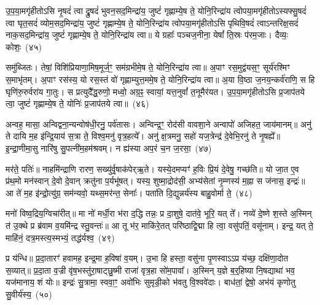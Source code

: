 {\anuvakamend[{अ॒ज॒य॒त् षट्च॑त्वारिꣳशच्च}]}%

उ॒प॒या॒मगृ॑हीतो\-ऽसि नृ॒षदं॑ त्वा द्रु॒षदं॑ भुवन॒सद॒मिन्द्रा॑य॒ जुष्टं॑ गृह्णाम्ये॒ष ते॒ योनि॒रिन्द्रा॑य त्वोपया॒मगृ॑हीतो\-ऽस्यफ्सु॒षदं॑ त्वा घृत॒सदं॑ व्योम॒सद॒मिन्द्रा॑य॒ जुष्टं॑ गृह्णाम्ये॒ष ते॒ योनि॒रिन्द्रा॑य त्वोपया॒मगृ॑हीतो\-ऽसि पृथिवि॒षदं॑ त्वा\-ऽन्तरिक्ष॒सदं॑ नाक॒सद॒मिन्द्रा॑य॒ जुष्टं॑ गृह्णाम्ये॒ष ते॒ योनि॒रिन्द्रा॑य त्वा॥ ये ग्रहाः᳚ पञ्चज॒नीना॒ येषां᳚ ति॒स्रः प॑रम॒जाः। दैव्यः॒ कोशः॒~(४५)

समु॑ब्जितः। तेषां॒ विशि॑प्रियाणा॒मिष॒मूर्ज॒ꣳ॒ सम॑ग्रभीमे॒ष ते॒ योनि॒रिन्द्रा॑य त्वा॥ अ॒पाꣳ रस॒मुद्व॑यस॒ꣳ॒ सूर्य॑रश्मिꣳ स॒माभृ॑तम्। अ॒पाꣳ रस॑स्य॒ यो रस॒स्तं वो॑ गृह्णाम्युत्त॒ममे॒ष ते॒ योनि॒रिन्द्रा॑य त्वा॥ अ॒या वि॒ष्ठा ज॒नय॒न्कर्व॑राणि॒ स हि घृणि॑रु॒रुर्वरा॑य गा॒तुः। स प्रत्युदै᳚द्ध॒रुणो॒ मध्वो॒ अग्र॒ꣴ॒ स्वायां॒ यत्त॒नुवां᳚ त॒नूमैर॑यत। उ॒प॒या॒मगृ॑हीतो\-ऽसि प्र॒जा\-प॑तये त्वा॒ जुष्टं॑ गृह्णाम्ये॒ष ते॒ योनिः॑ प्र॒जा\-प॑तये त्वा॥~(४६)

{\anuvakamend[{कोश॑स्त॒नुवां॒ त्रयो॑दश च}]}%

अन्वह॒ मासा॒ अन्विद्वना॒न्यन्वोष॑धी॒रनु॒ पर्व॑तासः। अन्विन्द्र॒ꣳ॒ रोद॑सी वावशा॒ने अन्वापो॑ अजिहत॒ जाय॑मानम्॥ अनु॑ ते दायि म॒ह इ॑न्द्रि॒याय॑ स॒त्रा ते॒ विश्व॒मनु॑ वृत्र॒हत्ये᳚। अनु॑ क्ष॒त्रमनु॒ सहो॑ यज॒त्रेन्द्र॑ दे॒वेभि॒रनु॑ ते नृ॒षह्ये᳚॥ इ॒न्द्रा॒णीमा॒सु नारि॑षु सु॒पत्नी॑म॒हम॑श्रवम्। न ह्य॑स्या अप॒रं च॒न ज॒रसा॒~(४७)

मर॑ते॒ पतिः॑॥ नाहमि॑न्द्राणि रारण॒ सख्यु॑र्वृ॒षाक॑पेर्‌ऋ॒ते। यस्ये॒दमप्यꣳ॑ ह॒विः प्रि॒यं दे॒वेषु॒ गच्छ॑ति॥ यो जा॒त ए॒व प्र॑थ॒मो मन॑स्वान् दे॒वो दे॒वान् क्रतु॑ना प॒र्यभू॑षत्। यस्य॒ शुष्मा॒द्रोद॑सी॒ अभ्य॑सेतां नृ॒म्णस्य॑ म॒ह्ना स ज॑नास॒ इन्द्रः॑॥ आ ते॑ म॒ह इ॑न्द्रो॒त्यु॑ग्र॒ सम॑न्यवो॒ यथ्स॒मर॑न्त॒ सेनाः᳚। पता॑ति दि॒द्युन्नर्य॑स्य बाहु॒वोर्मा ते॒~(४८)

मनो॑ विष्व॒द्रिय॒ग्विचा॑रीत्॥ मा नो॑ मर्धी॒रा भ॑रा द॒द्धि तन्नः॒ प्र दा॒शुषे॒ दात॑वे॒ भूरि॒ यत् ते᳚। नव्ये॑ दे॒ष्णे श॒स्ते अ॒स्मिन् त॑ उ॒क्थे प्र ब्र॑वाम व॒यमि॑न्द्र स्तु॒वन्तः॑॥ आ तू भ॑र॒ माकि॑रे॒तत् परि॑ष्ठाद्वि॒द्मा हि त्वा॒ वसु॑पतिं॒ वसू॑नाम्। इन्द्र॒ यत् ते॒ माहि॑नं॒ दत्र॒मस्त्य॒स्मभ्यं॒ तद्ध॑र्यश्व॒~(४९)

प्र य॑न्धि॥ प्र॒दा॒तारꣳ॑ हवामह॒ इन्द्र॒मा ह॒विषा॑ व॒यम्। उ॒भा हि हस्ता॒ वसु॑ना पृ॒णस्वा\-ऽऽ\-प्र य॑च्छ॒ दक्षि॑णा॒दोत स॒व्यात्॥ प्र॒दा॒ता व॒ज्री वृ॑ष॒भस्तु॑रा॒षाट्छु॒ष्मी राजा॑ वृत्र॒हा सो॑म॒पावा᳚। अ॒स्मिन् य॒ज्ञे ब॒र्॒\mbox{}हिष्या नि॒षद्याथा॑ भव॒ यज॑मानाय॒ शं योः॥ इन्द्रः॑ सु॒त्रामा॒ स्ववा॒ꣳ॒ अवो॑भिः सुमृडी॒को भ॑वतु वि॒श्ववे॑दाः। बाध॑तां॒ द्वेषो॒ अभ॑यं कृणोतु सु॒वीर्य॑स्य॒~(५०)

